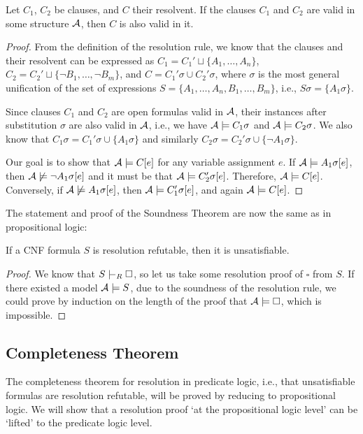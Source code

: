 \begin{proposition}
Let $C_1$, $C_2$ be clauses, and $C$ their resolvent. If the clauses $C_1$ and $C_2$ are valid in some structure $\mathcal{A}$, then $C$ is also valid in it.
\end{proposition}
\begin{proof}
From the definition of the resolution rule, we know that the clauses and their resolvent can be expressed as $C_1=C_1'\sqcup \{A_1,\dots,A_n\}$, $C_2=C_2'\sqcup \{\neg B_1,\dots,\neg B_m\}$, and $C=C_1'\sigma \cup C_2'\sigma$, where $\sigma$ is the most general unification of the set of expressions $S=\{A_1,\dots,A_n,B_1,\dots,B_m\}$, i.e., $S\sigma=\{A_1\sigma\}$.

Since clauses $C_1$ and $C_2$ are open formulas valid in $\mathcal{A}$, their instances after substitution $\sigma$ are also valid in $\mathcal{A}$, i.e., we have $\mathcal{A}\models C_1\sigma$ and $\mathcal{A}\models C_2\sigma$. We also know that $C_1\sigma=C_1'\sigma \cup \{A_1\sigma\}$ and similarly $C_2\sigma=C_2'\sigma \cup \{\neg A_1\sigma\}$.

Our goal is to show that $\mathcal{A}\models C[e]$ for any variable assignment $e$. If $\mathcal{A}\models A_1\sigma[e]$, then $\mathcal{A}\not\models\neg A_1\sigma[e]$ and it must be that $\mathcal{A}\models C_2'\sigma[e]$. Therefore, $\mathcal{A}\models C[e]$. Conversely, if $\mathcal{A}\not\models A_1\sigma[e]$, then $\mathcal{A}\models C_1'\sigma[e]$, and again $\mathcal{A}\models C[e]$.
\end{proof}

The statement and proof of the Soundness Theorem are now the same as in propositional logic:

\begin{theorem}\label{theorem:soundness-of-predicate-resolution}
    If a CNF formula $S$ is resolution refutable, then it is unsatisfiable.
\end{theorem}
\begin{proof}
    We know that $S\proves_R\square$, so let us take some resolution proof of $\square$ from $S$. If there existed a model $\mathcal{A}\models S$, due to the soundness of the resolution rule, we could prove by induction on the length of the proof that $\mathcal{A}\models\square$, which is impossible.
\end{proof}

\subsection{Completeness Theorem}

The completeness theorem for resolution in predicate logic, i.e., that unsatisfiable formulas are resolution refutable, will be proved by reducing to propositional logic. We will show that a resolution proof `at the propositional logic level' can be `lifted' to the predicate logic level.

